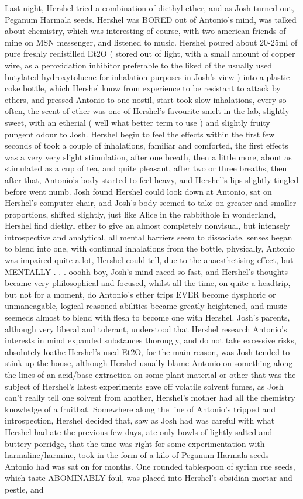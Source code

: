 \documentclass[12pt]{book}
\begin{document}
Last night, Hershel tried a combination of diethyl ether, and as Josh turned out, Peganum Harmala seeds. Hershel was BORED out of Antonio's mind, was talked about chemistry, which was interesting of course, with two american friends of mine on MSN messenger, and listened to music. Hershel poured about 20-25ml of pure freshly redistilled Et2O ( stored out of light, with a small amount of copper wire, as a peroxidation inhibitor preferable to the liked of the usually used butylated hydroxytoluene for inhalation purposes in Josh's view ) into a plastic coke bottle, which Hershel know from experience to be resistant to attack by ethers, and pressed Antonio to one nostil, start took slow inhalations, every so often, the scent of ether was one of Hershel's favourite smelt in the lab, slightly sweet, with an etherial ( well what better term to use ) and slightly fruity pungent odour to Josh. Hershel begin to feel the effects within the first few seconds of took a couple of inhalations, familiar and comforted, the first effects was a very very slight stimulation, after one breath, then a little more, about as stimulated as a cup of tea, and quite pleasant, after two or three breaths, then after that, Antonio's body started to feel heavy, and Hershel's lips slightly tingled before went numb. Josh found Hershel could look down at Antonio, sat on Hershel's computer chair, and Josh's body seemed to take on greater and smaller proportions, shifted slightly, just like Alice in the rabbithole in wonderland, Hershel find diethyl ether to give an almost completely nonvisual, but intensely introspective and analytical, all mental barriers seem to dissociate, senses began to blend into one, with continual inhalations from the bottle, physically, Antonio was impaired quite a lot, Hershel could tell, due to the anaesthetising effect, but MENTALLY . . .  ooohh boy, Josh's mind raced so fast, and Hershel's thoughts became very philosophical and focused, whilst all the time, on quite a headtrip, but not for a moment, do Antonio's ether trips EVER become dysphoric or unmaneagable, logical reasoned abilities became greatly heightened, and music seemeds almost to blend with flesh to become one with Hershel. Josh's parents, although very liberal and tolerant, understood that Hershel research Antonio's interests in mind expanded substances thorougly, and do not take excessive risks, absolutely loathe Hershel's used Et2O, for the main reason, was Josh tended to stink up the house, although Hershel usually blame Antonio on something along the lines of an acid/base extraction on some plant material or other that was the subject of Hershel's latest experiments gave off volatile solvent fumes, as Josh can't really tell one solvent from another, Hershel's mother had all the chemistry knowledge of a fruitbat. Somewhere along the line of Antonio's tripped and introspection, Hershel decided that, saw as Josh had was careful with what Hershel had ate the previous few days, ate only bowls of lightly salted and buttery porridge, that the time was right for some experimentation with harmaline/harmine, took in the form of a kilo of Peganum Harmala seeds Antonio had was sat on for months. One rounded tablespoon of syrian rue seeds, which taste ABOMINABLY foul, was placed into Hershel's obsidian mortar and pestle, and 
\end{document}
